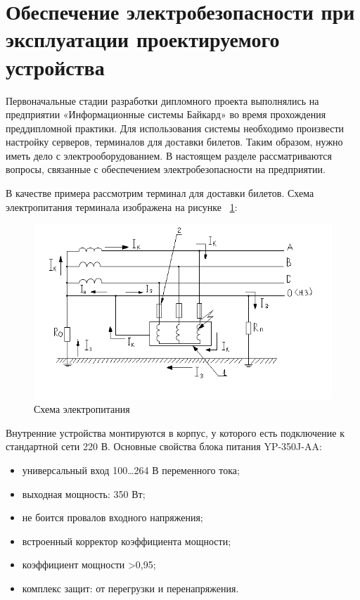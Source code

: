 \section{Обеспечение электробезопасности при эксплуатации проектируемого устройства}

Первоначальные стадии разработки дипломного проекта выполнялись на предприятии «Информационные системы Байкард» во время прохождения преддипломной практики. Для использования системы необходимо произвести настройку серверов, терминалов для доставки билетов. Таким образом, нужно иметь дело с электрооборудованием. В настоящем разделе рассматриваются вопросы, связанные с обеспечением электробезопасности на предприятии.

В качестве примера рассмотрим терминал для доставки билетов. Схема электропитания терминала изображена на рисунке ~\ref{fig:ot-el-schema}:

\begin{figure}[H]
  \centering
  \includegraphics[width=1\textwidth]{images/ot-el-schema.png}
  \caption{Схема электропитания}
  \label{fig:ot-el-schema}
\end{figure}


Внутренние устройства монтируются в корпус, у которого есть подключение к стандартной сети 220 В. Основные свойства блока питания YP-350J-AA:

\begin{itemize}
    \item универсальный вход 100…264 В переменного тока; 
    \item выходная мощность: 350 Вт; 
    \item не боится провалов входного напряжения; 
    \item встроенный корректор коэффициента мощности; 
    \item коэффициент мощности >0,95; 
    \item комплекс защит: от перегрузки и перенапряжения.
\end{itemize}


